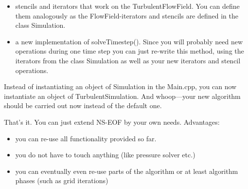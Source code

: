 \documentclass[pdftex,A4]{article}
\begin{document}
\begin{itemize}
\begin{itemize}
  \item stencils and iterators that work on the TurbulentFlowField. You can define them analogously as the FlowField-iterators and stencils are defined in the class Simulation.
  \item a new implementation of solveTimestep(). Since you will probably need new operations during one time step you can just re-write this method, using the iterators from the class Simulation as well as your new iterators and stencil operations.
  \end{itemize}
Instead of instantiating an object of Simulation in the Main.cpp, you can now instantiate an object of TurbulentSimulation. And whoop---your new algorithm should be carried out now instead of the default one.
\end{itemize}
That's it. You can just extend NS-EOF by your own needs. Advantages:
\begin{itemize}
\item you can re-use all functionality provided so far.
\item you do not have to touch anything (like pressure solver etc.)
\item you can eventually even re-use parts of the algorithm or at least algorithm phases (such as grid iterations)
\end{itemize}
\end{document}
